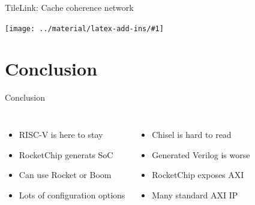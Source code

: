 \documentclass[]{beamer} %
\newcommand*{\COMPILEIMAGES}{}%
\newcommand\inputimage[1]{%
	\ifdefined\COMPILEIMAGES
		
	\else
		\texttt{[image: ../material/latex-add-ins/\#1]}
	\fi
	}
\begin{document}
\begin{frame}{TileLink: Cache coherence network}
		\inputimage{image3}
\end{frame}







\section[Conclusion]{Conclusion}


\begin{frame}{Conclusion}
		\begin{columns}
			\begin{itemize}
				\item RISC-V is here to stay
				\item RocketChip generats SoC
				\item Can use Rocket or Boom
				\item Lots of configuration options
			\end{itemize}
			\begin{itemize}
				\item Chisel is hard to read
				\item Generated Verilog is worse
				\item RocketChip exposes AXI
				\item Many standard AXI IP
			\end{itemize}
		\end{columns}
\end{frame}



\end{document}
